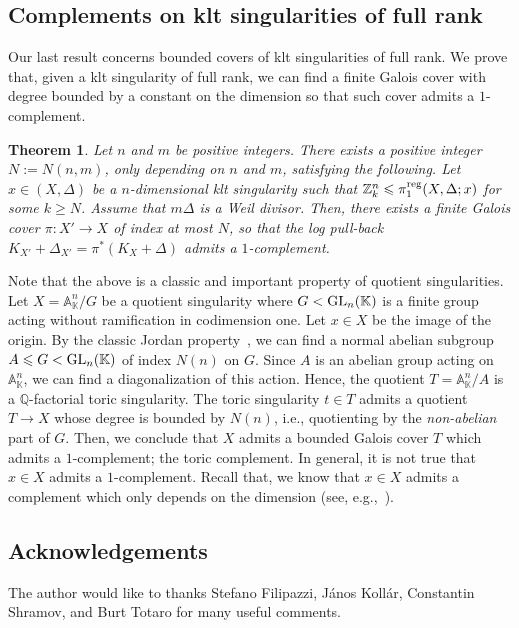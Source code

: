 \documentclass{amsart}
\renewcommand{\qq}{\mathbb{Q}}
\newcommand{\zz}{\mathbb{Z}}
\newtheorem{introthm}{Theorem}
\theoremstyle{remark}
\numberwithin{equation}{section}
\begin{document}
\subsection{Complements on klt singularities of full rank}
Our last result concerns bounded covers of klt singularities of full rank.
We prove that, given a klt singularity of full rank, 
we can find a finite Galois cover with degree bounded by a constant on the dimension so that such cover admits a $1$-complement.

\begin{introthm}\label{introthm:complements}
Let $n$ and $m$ be positive integers.
There exists a positive integer $N:=N(n,m)$, only depending on $n$ and $m$, satisfying the following.
Let $x\in (X,\Delta)$ be a $n$-dimensional klt singularity
such that $\zz^n_k \leqslant \pi_1^{\rm reg}(X,\Delta;x)$
for some $k\geq N$.
Assume that $m\Delta$ is a Weil divisor.
Then, there exists a finite Galois cover $\pi\colon X'\rightarrow X$
of index at most $N$, 
so that the log pull-back $K_{X'}+\Delta_{X'}=\pi^*(K_X+\Delta)$
admits a $1$-complement.
\end{introthm}

Note that the above is a classic and important property of quotient singularities.
Let $X=\mathbb{A}_\mathbb{K}^n/G$ be a quotient singularity
where $G<{\rm GL}_n(\mathbb{K})$ is a finite group acting without ramification in codimension one.
Let $x\in X$ be the image of the origin.
By the classic Jordan property~\cite{Jor73}, 
we can find a normal abelian subgroup $A\leqslant G<{\rm GL}_n(\mathbb{K})$ of index $N(n)$ on $G$.
Since $A$ is an abelian group acting on $\mathbb{A}_\mathbb{K}^n$,
we can find a diagonalization of this action.
Hence, the quotient $T=\mathbb{A}^n_\mathbb{K}/A$ is a $\qq$-factorial toric singularity.
The toric singularity $t\in T$ admits a quotient $T\rightarrow X$ whose degree is bounded by $N(n)$, i.e., quotienting by the \textit{non-abelian} part of $G$.
Then, we conclude that $X$ admits a bounded Galois cover
$T$ which admits a $1$-complement; the toric complement.
In general, it is not true that $x\in X$ admits a $1$-complement.
Recall that, we know that $x\in X$ admits a complement which only depends on the dimension (see, e.g.,~\cite{Bir16a}).

\subsection*{Acknowledgements} 
The author would like to thanks
Stefano Filipazzi,
J\'anos Koll\'ar, 
Constantin Shramov, 
and Burt Totaro 
for many useful comments.
\end{document}
